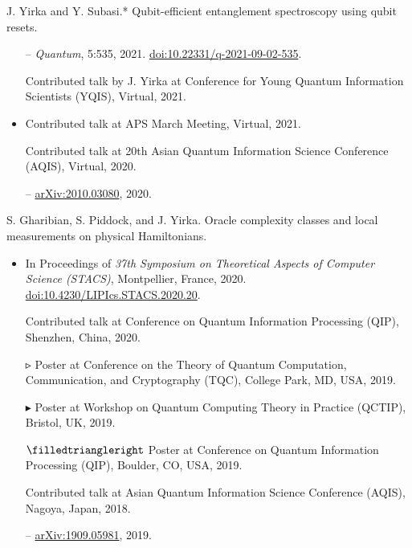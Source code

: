 \documentclass[11pt,letterpaper,serif]{moderncv}
\begin{document}
J. Yirka and Y. Subasi.*\quad
Qubit-efficient entanglement spectroscopy using qubit resets.
\begin{adjustwidth}{.1in}{}
	\begin{itemize}
		\item[--] \textit{Quantum}, 5:535, 2021.\quad
		\href{https://doi.org/10.22331/q-2021-09-02-535}{doi:10.22331/q-2021-09-02-535}.
		\item[\textbullet] Contributed talk by J. Yirka at Conference for Young Quantum Information Scientists (YQIS), Virtual, 2021.
		\item Contributed talk at APS March Meeting, Virtual, 2021.
		\item[\textbullet] Contributed talk at 20th Asian Quantum Information Science Conference (AQIS), Virtual, 2020.
		\item[--] \href{https://arxiv.org/abs/2010.03080}{arXiv:2010.03080}, 2020.
	\end{itemize}
\end{adjustwidth}
\medskip

S. Gharibian, S. Piddock, and J. Yirka.\quad
Oracle complexity classes and local measurements on physical Hamiltonians.
\begin{adjustwidth}{.1in}{}
	\begin{itemize}
		\item In Proceedings of \textit{37th Symposium on Theoretical Aspects of Computer Science (STACS)}, Montpellier, France, 2020.\quad
		\href{https://doi.org/10.4230/LIPIcs.STACS.2020.20}{doi:10.4230/LIPIcs.STACS.2020.20}.
		\item[\textbullet] Contributed talk at Conference on Quantum Information Processing (QIP), Shenzhen, China, 2020.
		\item[$\smalltriangleright$] Poster at Conference on the Theory of Quantum Computation, Communication, and Cryptography (TQC), College Park, MD, USA, 2019.
		\item[$\blacktriangleright$] Poster at Workshop on Quantum Computing Theory in Practice (QCTIP), Bristol, UK, 2019.
		\item[$\filledtriangleright$] Poster at Conference on Quantum Information Processing (QIP), Boulder, CO, USA, 2019.
		\item[\textbullet] Contributed talk at Asian Quantum Information Science Conference (AQIS), Nagoya, Japan, 2018.
		\item[--]  \href{https://arxiv.org/abs/1909.05981}{arXiv:1909.05981}, 2019.
	\end{itemize}
\end{adjustwidth}
\medskip
\end{document}
